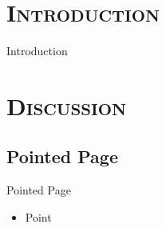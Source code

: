 \documentclass[xcolor=x11names,compress]{beamer}
\renewcommand{\(}{\begin{columns}}
\renewcommand{\)}{\end{columns}}
\newcommand{\<}[1]{\begin{column}{#1}}
\renewcommand{\>}{\end{column}}
\begin{document}
\section{\scshape Introduction}

\begin{frame}{Introduction}
\tableofcontents
\end{frame}


\section{\scshape Discussion}
\subsection{Pointed Page}
\begin{frame}{Pointed Page}
\begin{itemize}
\item Point
\end{itemize}
\end{frame}

\end{document}
